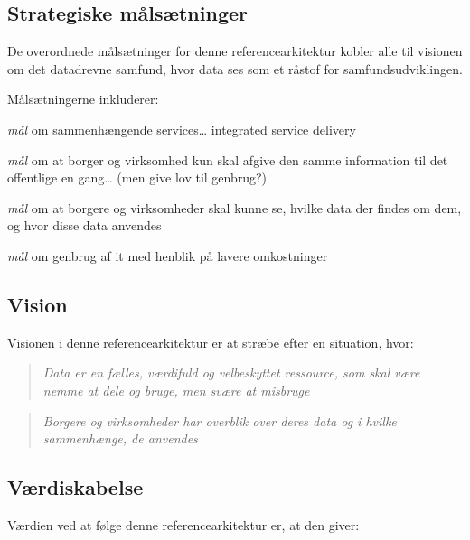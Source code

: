 \subsection{Strategiske
målsætninger}\label{strategiske-muxe5lsuxe6tninger}

De overordnede målsætninger for denne referencearkitektur kobler alle
til visionen om det datadrevne samfund, hvor data ses som et råstof for
samfundsudviklingen.

Målsætningerne inkluderer:

\begin{description}
\tightlist
\item[Interoperabilitet]
\emph{mål} om sammenhængende services\ldots{} integrated service
delivery
\item[Once-only]
\emph{mål} om at borger og virksomhed kun skal afgive den samme
information til det offentlige en gang\ldots{} (men give lov til
genbrug?)
\item[Transparens]
\emph{mål} om at borgere og virksomheder skal kunne se, hvilke data der
findes om dem, og hvor disse data anvendes
\item[Genbrug]
\emph{mål} om genbrug af it med henblik på lavere omkostninger
\end{description}

\subsection{Vision}\label{vision}

Visionen i denne referencearkitektur er at stræbe efter en situation,
hvor:

\begin{quote}
\emph{Data er en fælles, værdifuld og velbeskyttet ressource, som skal
være nemme at dele og bruge, men svære at misbruge}
\end{quote}

\begin{quote}
\emph{Borgere og virksomheder har overblik over deres data og i hvilke
sammenhænge, de anvendes}
\end{quote}

\subsection{Værdiskabelse}\label{vuxe6rdiskabelse}

Værdien ved at følge denne referencearkitektur er, at den giver:

